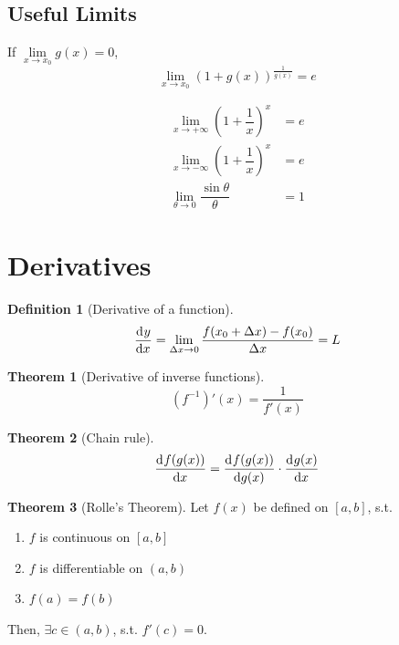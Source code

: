 \documentclass[fleqn, a4paper, 10pt]{article}
\theoremstyle{definition}
\newtheorem{definition}{Definition}
\theoremstyle{theorem}
\newtheorem{theorem}{Theorem}
\theoremstyle{remark}
\begin{document}
\begin{multicols}{2}
\subsection{Useful Limits}

If $\lim\limits_{x \rightarrow x_0} g(x) = 0$, 
\begin{equation*}
	\lim\limits_{x \rightarrow x_0} (1 + g(x))^{\frac{1}{g(x)}} = e
\end{equation*}

\begin{align*}
	\lim\limits_{x \rightarrow +\infty} \left(1 + \dfrac{1}{x}\right) ^x &= e\\
	\lim\limits_{x \rightarrow -\infty} \left(1 + \dfrac{1}{x}\right) ^x &= e\\
	\lim\limits_{\theta \rightarrow 0} \dfrac{\sin \theta}{\theta} &= 1
\end{align*}

\section{Derivatives}

\begin{definition}[Derivative of a function]
	\begin{equation*}
		\dod{y}{x} = \lim\limits_{\Delta x \rightarrow 0} \dfrac{f(x_0 + \Delta x) - f(x_0)}{\Delta x} = L
	\end{equation*}
\end{definition}

\begin{theorem}[Derivative of inverse functions]
	\begin{equation*}
	(f^{-1})'(x) = \dfrac{1}{f'(x)}
	\end{equation*}
\end{theorem}

\begin{theorem}[Chain rule]
	\begin{equation*}
	\dod{f(g(x))}{x} = \dod{f(g(x))}{g(x)} \cdot \dod{g(x)}{x}
	\end{equation*}
\end{theorem}

\begin{theorem}[Rolle's Theorem]
	Let $f(x)$ be defined on $[a, b]$, s.t. 
	\begin{enumerate}
		\item $f$ is continuous on $[a, b]$ \label{Rolle condition 1}
		\item $f$ is differentiable on $(a, b)$ \label{Rolle condition 2}
		\item $f(a) = f(b)$ \label{Rolle condition 3}
	\end{enumerate}
	Then, $\exists c \in (a, b)$, s.t. $f'(c) = 0$.
\end{theorem}


\end{multicols}
\end{document}
